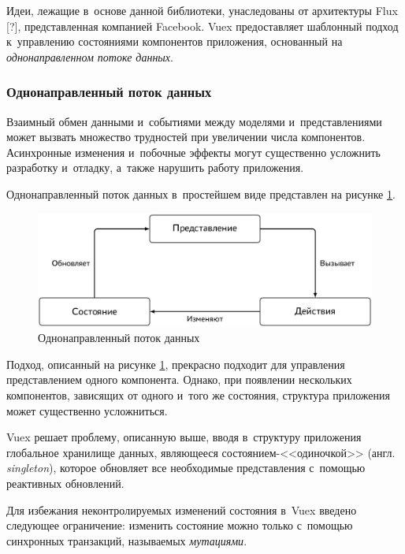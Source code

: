 Идеи, лежащие в~основе данной библиотеки, унаследованы от архитектуры Flux [?], представленная компанией Facebook. Vuex предоставляет шаблонный подход к~управлению состояниями компонентов приложения, основанный на \emph{однонаправленном потоке данных}.


\subsubsection{Однонаправленный поток данных}

Взаимный обмен данными и~событиями между моделями и~представлениями может вызвать множество трудностей при увеличении числа компонентов. Асинхронные изменения и~побочные эффекты могут существенно усложнить разработку и~отладку, а~также нарушить работу приложения.

Однонаправленный поток данных в~простейшем виде представлен на рисунке \ref{fig:simple-oneway-data-flow}.

\begin{figure}[h!]
  \centering
  \setlength{\fboxsep}{5pt}
  \includegraphics[width=.9\textwidth]{img/tikz/simple-oneway-data-flow/pic}
  \vspace*{12pt}
  \caption{Однонаправленный поток данных}\label{fig:simple-oneway-data-flow}
\end{figure}

Подход, описанный на рисунке \ref{fig:simple-oneway-data-flow}, прекрасно подходит для управления представлением одного компонента. Однако, при появлении нескольких компонентов, зависящих от одного и~того же состояния, структура приложения может существенно усложниться.

Vuex решает проблему, описанную выше, вводя в~структуру приложения глобальное хранилище данных, являющееся состоянием-<<одиночкой>> (англ. \emph{singleton}), которое обновляет все необходимые представления с~помощью реактивных обновлений.

Для избежания неконтролируемых изменений состояния в~Vuex введено следующее ограничение: изменить состояние можно только с~помощью синхронных транзакций, называемых \emph{мутациями}.

